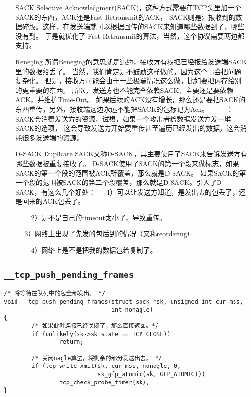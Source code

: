 \begin{enumerate}
\item[SACK]         Selective Acknowledgment(SACK)，这种方式需要在TCP头里加一个SACK的东西，ACK还是Fast Retransmit的ACK，
                    SACK则是汇报收到的数据碎版。这样，在发送端就可以根据回传的SACK来知道哪些数据到了，哪些没有到。
                    于是就优化了 Fast Retransmit的算法。当然，这个协议需要两边都支持。
\item[Reneging]     所谓Reneging的意思就是违约，接收方有权把已经报给发送端SACK里的数据给丢了。
                    当然，我们肯定是不鼓励这样做的，因为这个事会把问题复杂化。
                    但是，接收方可能会由于一些极端情况这么做，比如要把内存给别的更重要的东西。
                    所以，发送方也不能完全依赖SACK，主要还是要依赖ACK，并维护Time-Out。
                    如果后续的ACK没有增长，那么还是要把SACK的东西重传，另外，接收端这边永远不能把SACK的包标记为Ack。
　　                    \color{red}{注意}：SACK会消费发送方的资源，试想，如果一个攻击者给数据发送方发一堆SACK的选项，
                    这会导致发送方开始要重传甚至遍历已经发出的数据，这会消耗很多发送端的资源。

\item[D-SACK]       Duplicate SACK又称D-SACK，其主要使用了SACK来告诉发送方有哪些数据被重复接收了。
                    D-SACK使用了SACK的第一个段来做标志，如果SACK的第一个段的范围被ACK所覆盖，那么就是D-SACK。
                    如果SACK的第一个段的范围被SACK的第二个段覆盖，那么就是D-SACK。引入了D-SACK，有这么几个好处：
　                      1）可以让发送方知道，是发出去的包丢了，还是回来的ACK包丢了。

　　                        2）是不是自己的timeout太小了，导致重传。

　                      3）网络上出现了先发的包后到的情况（又称reordering）

　　                        4）网络上是不是把我的数据包给复制了。
\end{enumerate}

    \subsection{\texttt{__tcp_push_pending_frames}}
\begin{verbatim}
/* 将等待在队列中的包全部发出。 */
void __tcp_push_pending_frames(struct sock *sk, unsigned int cur_mss,
                               int nonagle)
{
        /* 如果此时连接已经关闭了，那么直接返回。*/
        if (unlikely(sk->sk_state == TCP_CLOSE))
                return;

        /* 关闭nagle算法，将剩余的部分发送出去。 */
        if (tcp_write_xmit(sk, cur_mss, nonagle, 0,
                           sk_gfp_atomic(sk, GFP_ATOMIC)))
                tcp_check_probe_timer(sk);
}
\end{verbatim}
